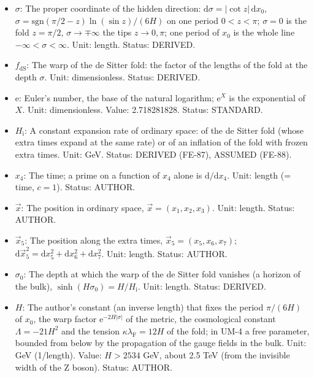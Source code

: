 \documentclass[
  10pt,
]{article}
\begin{document}
\begin{itemize}
  the coordinate volume element. Unit: length (each coordinate). Status:
  AUTHOR.
\item
  \(\sigma\): The proper coordinate of the hidden direction:
  \(\mathrm{d}\sigma = \lvert\cot z\rvert\,\mathrm{d}x_0\),
  \(\sigma = \mathrm{sgn}(\pi/2 - z)\ln(\sin z)/(6H)\) on one period
  \(0 < z < \pi\); \(\sigma = 0\) is the fold \(z = \pi/2\),
  \(\sigma \to \mp\infty\) the tips \(z \to 0, \pi\); one period of
  \(x_0\) is the whole line \(-\infty < \sigma < \infty\). Unit: length.
  Status: DERIVED.
\item
  \(f_{\mathrm{dS}}\): The warp of the de Sitter fold: the factor of the
  lengths of the fold at the depth \(\sigma\). Unit: dimensionless.
  Status: DERIVED.
\item
  \(\mathrm{e}\): Euler's number, the base of the natural logarithm;
  \(\mathrm{e}^{X}\) is the exponential of \(X\). Unit: dimensionless.
  Value: 2.718281828. Status: STANDARD.
\item
  \(H_{\mathrm{i}}\): A constant expansion rate of ordinary space: of
  the de Sitter fold (whose extra times expand at the same rate) or of
  an inflation of the fold with frozen extra times. Unit: GeV. Status:
  DERIVED (FE-87), ASSUMED (FE-88).
\item
  \(x_4\): The time; a prime on a function of \(x_4\) alone is
  \(\mathrm{d}/\mathrm{d}x_4\). Unit: length (= time, \(c = 1\)).
  Status: AUTHOR.
\item
  \(\vec x\): The position in ordinary space,
  \(\vec x = (x_1, x_2, x_3)\). Unit: length. Status: AUTHOR.
\item
  \(\vec x_5\): The position along the extra times,
  \(\vec x_5 = (x_5, x_6, x_7)\);
  \(\mathrm{d}\vec x_5^2 = \mathrm{d}x_5^2 + \mathrm{d}x_6^2 + \mathrm{d}x_7^2\).
  Unit: length. Status: AUTHOR.
\item
  \(\sigma_0\): The depth at which the warp of the de Sitter fold
  vanishes (a horizon of the bulk),
  \(\sinh(H\sigma_0) = H/H_{\mathrm{i}}\). Unit: length. Status:
  DERIVED.
\item
  \(H\): The author's constant (an inverse length) that fixes the period
  \(\pi/(6H)\) of \(x_0\), the warp factor
  \(\mathrm{e}^{-2H\lvert\sigma\rvert}\) of the metric, the cosmological
  constant \(\Lambda = -21H^2\) and the tension
  \(\kappa\lambda_{\mathrm{F}} = 12H\) of the fold; in UM-4 a free
  parameter, bounded from below by the propagation of the gauge fields
  in the bulk. Unit: GeV (1/length). Value: \(H > 2534\) GeV, about 2.5
  TeV (from the invisible width of the Z boson). Status: AUTHOR.

\end{itemize}
\end{document}
